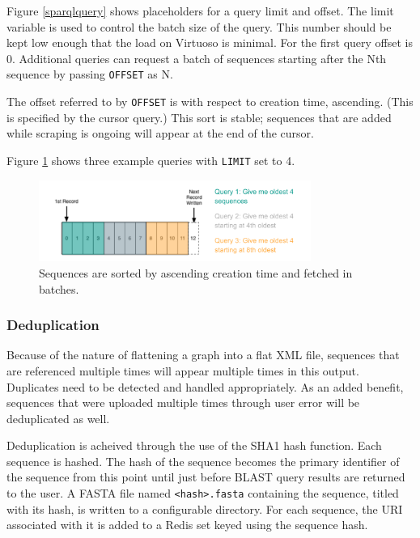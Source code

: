 \documentclass[journal,comsoc]{IEEEtran}
\begin{document}
Figure \ref{sparqlquery} shows placeholders for a query limit and offset.
The limit variable is used to control the batch size of the query. This number 
should be kept low enough that the load on Virtuoso is minimal. For the first 
query offset is 0. Additional queries can request a batch of sequences starting
after the Nth sequence by passing \texttt{OFFSET} as N.

The offset referred to by \texttt{OFFSET} is with respect to creation time, ascending.
(This is specified by the cursor query.) This sort is stable; sequences that are added
while scraping is ongoing will appear at the end of the cursor. 

Figure \ref{pagination} shows three example queries with \texttt{LIMIT} set to 4.

\begin{figure}[!t]
\centering
\includegraphics[width=3.5in]{paginatedqueries}
\caption{Sequences are sorted by ascending creation time and fetched in batches.}
\label{pagination}
\end{figure}


\subsubsection{Deduplication}

Because of the nature of flattening a graph into a flat XML file, sequences that
are referenced multiple times will appear multiple times in this output. Duplicates
need to be detected and handled appropriately. As an added benefit, sequences that 
were uploaded multiple times through user error will be deduplicated as well.

Deduplication is acheived through the use of the SHA1 hash function. Each sequence
is hashed. The hash of the sequence becomes the primary identifier of the sequence
from this point until just before BLAST query results are returned to the user. 
A FASTA file named \texttt{<hash>.fasta} containing the sequence, titled with
its hash, is written to a configurable directory.
For each sequence, the URI associated with it is added to
a Redis set keyed using the sequence hash. 
\end{document}
